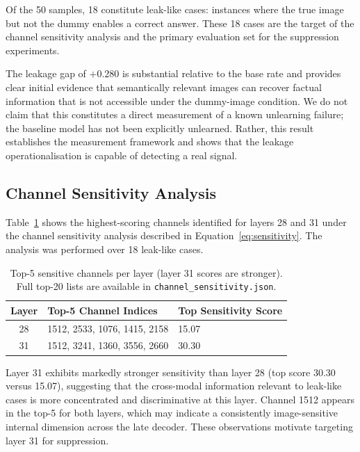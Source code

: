 \documentclass[12pt, a4paper]{article}
\begin{document}
Of the 50 samples, 18 constitute leak-like cases: instances where the true image but not
the dummy enables a correct answer.
These 18 cases are the target of the channel sensitivity analysis and the primary
evaluation set for the suppression experiments.

The leakage gap of $+0.280$ is substantial relative to the base rate and provides
clear initial evidence that semantically relevant images can recover factual information
that is not accessible under the dummy-image condition.
We do not claim that this constitutes a direct measurement of a known unlearning
failure; the baseline model has not been explicitly unlearned.
Rather, this result establishes the measurement framework and shows that the leakage
operationalisation is capable of detecting a real signal.

\subsection{Channel Sensitivity Analysis}

Table~\ref{tab:channels} shows the highest-scoring channels identified for layers 28
and 31 under the channel sensitivity analysis described in
Equation~\eqref{eq:sensitivity}.
The analysis was performed over 18 leak-like cases.

\begin{table}[h]
\centering
\caption{Top-5 sensitive channels per layer (layer 31 scores are stronger).
Full top-20 lists are available in \texttt{channel\_sensitivity.json}.}
\label{tab:channels}
\begin{tabular}{cll}
\toprule
\textbf{Layer} & \textbf{Top-5 Channel Indices} & \textbf{Top Sensitivity Score} \\
\midrule
28 & 1512, 2533, 1076, 1415, 2158 & 15.07 \\
31 & 1512, 3241, 1360, 3556, 2660 & 30.30 \\
\bottomrule
\end{tabular}
\end{table}

Layer 31 exhibits markedly stronger sensitivity than layer 28 (top score 30.30 versus
15.07), suggesting that the cross-modal information relevant to leak-like cases is more
concentrated and discriminative at this layer.
Channel 1512 appears in the top-5 for both layers, which may indicate a consistently
image-sensitive internal dimension across the late decoder.
These observations motivate targeting layer 31 for suppression.
\end{document}

